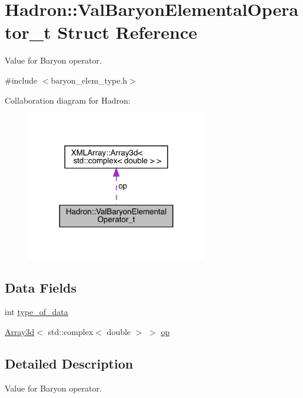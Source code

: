 \hypertarget{structHadron_1_1ValBaryonElementalOperator__t}{}\section{Hadron\+:\+:Val\+Baryon\+Elemental\+Operator\+\_\+t Struct Reference}
\label{structHadron_1_1ValBaryonElementalOperator__t}


Value for Baryon operator.  




{\ttfamily \#include $<$baryon\+\_\+elem\+\_\+type.\+h$>$}



Collaboration diagram for Hadron\+:\nopagebreak
\begin{figure}[H]
\begin{center}
\leavevmode
\includegraphics[width=224pt]{d8/d55/structHadron_1_1ValBaryonElementalOperator__t__coll__graph}
\end{center}
\end{figure}
\subsection*{Data Fields}
\begin{DoxyCompactItemize}
\item 
int \mbox{\hyperlink{structHadron_1_1ValBaryonElementalOperator__t_acd2ecc17e571292524c3fc8a1eedc605}{type\+\_\+of\+\_\+data}}
\item 
\mbox{\hyperlink{classXMLArray_1_1Array3d}{Array3d}}$<$ std\+::complex$<$ double $>$ $>$ \mbox{\hyperlink{structHadron_1_1ValBaryonElementalOperator__t_aeb438473276ebd527b1d6a1c72d0630d}{op}}
\end{DoxyCompactItemize}


\subsection{Detailed Description}
Value for Baryon operator. 

